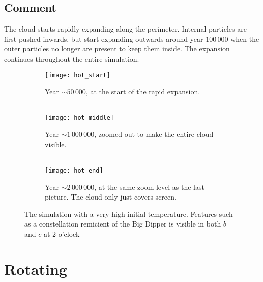 \documentclass[../main.tex]{subfiles}
\begin{document}
\subsection{Comment}
The cloud starts rapidly expanding along the perimeter. Internal particles are first pushed inwards,
but start expanding outwards around year $100 \, 000$ when the outer particles no longer are present
to keep them inside. The expansion continues throughout the entire simulation.

\begin{figure}[p]
  \centering
  \begin{subfigure}[b]{0.495\linewidth}
    \texttt{[image: hot\_start]}
    \caption{Year $\sim 50 \, 000$, at the start of the rapid expansion.\\\ }
  \end{subfigure}
  \begin{subfigure}[b]{0.495\linewidth}
    \texttt{[image: hot\_middle]}
    \caption{Year $\sim 1 \, 000 \, 000$, zoomed out to make the entire cloud visible.\\\ }
  \end{subfigure}
  \begin{subfigure}[b]{0.495\linewidth}
    \texttt{[image: hot\_end]}
    \caption{Year $\sim 2 \, 000 \, 000$, at the same zoom level as the last picture. The cloud only
    just covers screen.
}
  \end{subfigure}
  \caption{The simulation with a very high initial temperature. Features such as a constellation
      remicient of the Big Dipper is visible in both $b$ and $c$ at 2 o'clock }
  \label{fig:coffee}
\end{figure}
\restoregeometry

\section{Rotating}
\end{document}
